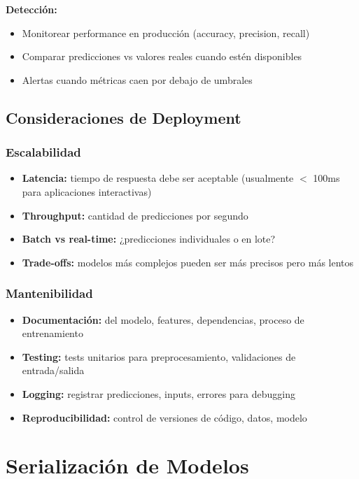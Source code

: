 \documentclass[11pt,a4paper]{article}
\begin{document}
\textbf{Detección:}
\begin{itemize}
\item Monitorear performance en producción (accuracy, precision, recall)
\item Comparar predicciones vs valores reales cuando estén disponibles
\item Alertas cuando métricas caen por debajo de umbrales
\end{itemize}

\subsection{Consideraciones de Deployment}

\subsubsection{Escalabilidad}

\begin{itemize}
\item \textbf{Latencia:} tiempo de respuesta debe ser aceptable (usualmente $<$ 100ms para aplicaciones interactivas)
\item \textbf{Throughput:} cantidad de predicciones por segundo
\item \textbf{Batch vs real-time:} ¿predicciones individuales o en lote?
\item \textbf{Trade-offs:} modelos más complejos pueden ser más precisos pero más lentos
\end{itemize}

\subsubsection{Mantenibilidad}

\begin{itemize}
\item \textbf{Documentación:} del modelo, features, dependencias, proceso de entrenamiento
\item \textbf{Testing:} tests unitarios para preprocesamiento, validaciones de entrada/salida
\item \textbf{Logging:} registrar predicciones, inputs, errores para debugging
\item \textbf{Reproducibilidad:} control de versiones de código, datos, modelo
\end{itemize}

\section{Serialización de Modelos}
\end{document}
